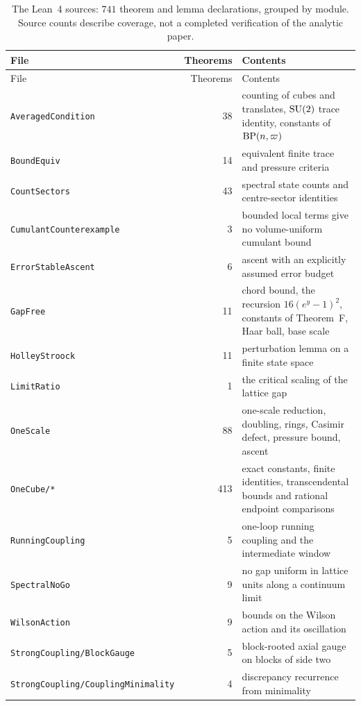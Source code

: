 {
\footnotesize
\setlength{\LTcapwidth}{\textwidth}
\begin{longtable}{@{}>{\raggedright\arraybackslash}p{}r>{\raggedright\arraybackslash}p{}@{}}
\caption{The Lean~4 sources: $741$ theorem and lemma declarations, grouped by module. Source counts describe coverage, not a completed verification of the analytic paper.}\label{tab:lean}\\
\toprule
File & Theorems & Contents\\
\midrule
\endfirsthead
\toprule
File & Theorems & Contents\\
\midrule
\endhead
\bottomrule
\endfoot
\bottomrule
\endlastfoot
\texttt{AveragedCondition} & 38 & counting of cubes and translates, $\mathrm{SU}(2)$ trace identity, constants of $\mathrm{BP}(n,\varpi)$\\
\texttt{BoundEquiv} & 14 & equivalent finite trace and pressure criteria\\
\texttt{CountSectors} & 43 & spectral state counts and centre-sector identities\\
\texttt{CumulantCounterexample} & 3 & bounded local terms give no volume-uniform cumulant bound\\
\texttt{ErrorStableAscent} & 6 & ascent with an explicitly assumed error budget\\
\texttt{GapFree} & 11 & chord bound, the recursion $16(e^y-1)^2$, constants of Theorem~F, Haar ball, base scale\\
\texttt{HolleyStroock} & 11 & perturbation lemma on a finite state space\\
\texttt{LimitRatio} & 1 & the critical scaling of the lattice gap\\
\texttt{OneScale} & 88 & one-scale reduction, doubling, rings, Casimir defect, pressure bound, ascent\\
\texttt{OneCube/*} & 413 & exact constants, finite identities, transcendental bounds and rational endpoint comparisons\\
\texttt{RunningCoupling} & 5 & one-loop running coupling and the intermediate window\\
\texttt{SpectralNoGo} & 9 & no gap uniform in lattice units along a continuum limit\\
\texttt{WilsonAction} & 9 & bounds on the Wilson action and its oscillation\\
\texttt{StrongCoupling/BlockGauge} & 5 & block-rooted axial gauge on blocks of side two\\
\texttt{StrongCoupling/CouplingMinimality} & 4 & discrepancy recurrence from minimality\\

\end{longtable}}
